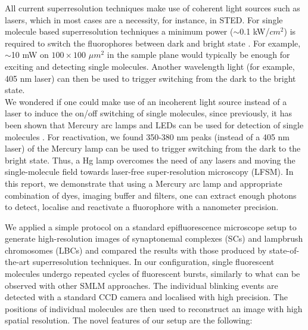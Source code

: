 \documentclass[9pt,twocolumn,twoside]{pnas-new}
\begin{document}
All current superresolution techniques make use of coherent light sources such as lasers, which in most cases are a necessity, for instance, in STED. For single molecule based superresolution techniques a minimum power ($\sim$0.1 kW/$cm^2$) is required to switch the fluorophores between dark and bright state \citep{dickson1997off, betzig2006}. For example, $\sim$10 mW on $100 \times 100$  $ \mu m^2$ in the sample plane would typically be enough for exciting and detecting single molecules. Another wavelength light (for example, 405 nm laser) can then be used to trigger switching from the dark to the bright state. \\
We wondered if one could make use of an incoherent light source instead of a laser to induce the on/off switching of single molecules, since previously, it has been shown that Mercury arc lamps and LEDs can be used for detection of single molecules \citep{chiu1999single, gerhardt2011detection}. For reactivation, we found 350-380 nm peaks (instead of a 405 nm laser) of the Mercury lamp can be used to trigger switching from the dark to the bright state. Thus, a Hg lamp overcomes the need of any lasers and moving the single-molecule field towards laser-free super-resolution microscopy (LFSM). In this report, we demonstrate that using a Mercury arc lamp and appropriate combination of dyes, imaging buffer and filters, one can extract enough photons to detect, localise and reactivate a fluorophore with a nanometer precision.

We applied a simple protocol on a standard epifluorescence microscope setup to generate high-resolution images of synaptonemal complexes (SCs) and lampbrush chromosomes (LBCs) and compared the results with those produced by state-of-the-art superresolution techniques. In our configuration, single fluorescent molecules undergo repeated cycles of fluorescent bursts, similarly to what can be observed with other SMLM approaches. The individual blinking events are detected with a standard CCD camera and localised with high precision. The positions of individual molecules are then used to reconstruct an image with high spatial resolution. The novel features of our setup are the following:
\end{document}
